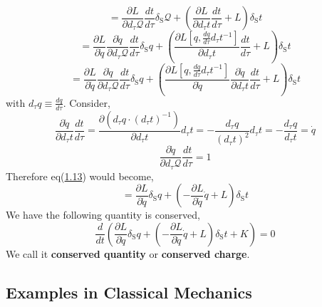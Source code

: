 \documentclass[12pt]{article}
\numberwithin{equation}{section}
\begin{document}
\[ = \frac{\partial L}{\partial d_{\tau}\mathcal{Q}}\frac{dt}{d\tau}\delta_{\text{S}}\mathcal{Q}+\left(\frac{\partial L}{\partial d_{\tau}t}\frac{dt}{d\tau}+L\right)\delta_{\text{S}}t\]
\[ = \frac{\partial L}{\partial \dot{q}}\frac{\partial\dot{q}}{\partial d_{\tau}\mathcal{Q}}\frac{dt}{d\tau}\delta_{\text{S}}q+\left(\frac{\partial L\left[q,\frac{dq}{d\tau}d_{\tau}t^{-1}\right]}{\partial d_{\tau}t}\frac{dt}{d\tau}+L\right)\delta_{\text{S}}t\]
\begin{equation}
    = \frac{\partial L}{\partial \dot{q}}\frac{\partial\dot{q}}{\partial d_{\tau}\mathcal{Q}}\frac{dt}{d\tau}\delta_{\text{S}}q+\left(\frac{\partial L\left[q,\frac{dq}{d\tau}d_{\tau}t^{-1}\right]}{\partial \dot{q}}\frac{\partial\dot{q}}{\partial d_{\tau}t}\frac{dt}{d\tau}+L\right)\delta_{\text{S}}t
\end{equation}\label{1.13}
with $d_{\tau}q\equiv \frac{dq}{d\tau}$. Consider,
\[\frac{\partial\dot{q}}{\partial d_{\tau}t}\frac{dt}{d\tau}=\frac{\partial\left(d_{\tau}q\cdot(d_{\tau}t)^{-1}\right)}{\partial d_{\tau}t}d_{\tau}t = -\frac{d_{\tau}q}{(d_{\tau}t)^2}d_{\tau}t = -\frac{d_{\tau}q}{d_{\tau}t} = \dot{q}\]
\[\frac{\partial \dot{q}}{\partial d_{\tau}\mathcal{Q}}\frac{dt}{d\tau} = 1\]
Therefore eq(\hyperref[1.13]{1.13}) would become,
\[ = \frac{\partial L}{\partial \dot{q}}\delta_{\text{S}}q+\left(-\frac{\partial L}{\partial \dot{q}}\dot{q}+L\right)\delta_{\text{S}}t\]
We have the following quantity is conserved,
\begin{equation}
    \frac{d}{dt}\left(\frac{\partial L}{\partial \dot{q}}\delta_{\text{S}}q+\left(-\frac{\partial L}{\partial \dot{q}}\dot{q}+L\right)\delta_{\text{S}}t+K\right) = 0
\end{equation}
We call it \textbf{conserved quantity} or \textbf{conserved charge}.
\subsection{Examples in Classical Mechanics}
\end{document}
